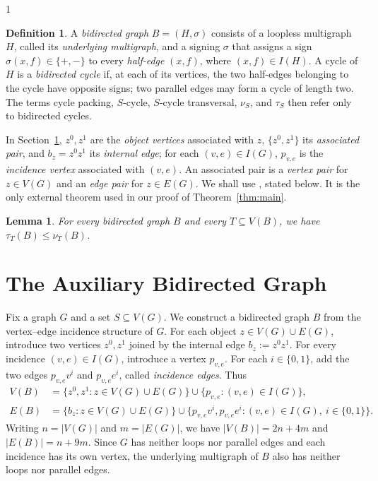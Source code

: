 \documentclass[a4paper,11pt]{article}
\theoremstyle{plain}
\newtheorem{lemma}[theorem]{Lemma}
\theoremstyle{definition}
\newtheorem{definition}[theorem]{Definition}
\theoremstyle{remark}
\begin{document}
\begin{spacing}{1}
\begin{definition}\label{def:bidirected}
A \emph{bidirected graph} $B=(H,\sigma)$ consists of a loopless multigraph
$H$, called its \emph{underlying multigraph}, and a signing $\sigma$ that
assigns a sign $\sigma(x,f)\in\{+,-\}$ to every \emph{half-edge} $(x,f)$,
where $(x,f)\in I(H)$.  A cycle of $H$ is a \emph{bidirected cycle} if, at
each of its vertices, the two half-edges belonging to the cycle have opposite
signs; two parallel edges may form a cycle of length two.  The terms cycle packing, $S$-cycle,
$S$-cycle transversal, $\nu_S$, and $\tau_S$ then refer only to bidirected
cycles.
\end{definition}

In Section~\ref{sec:construction}, $z^0,z^1$ are the \emph{object vertices}
associated with $z$, $\{z^0,z^1\}$ its \emph{associated pair}, and
$b_z=z^0z^1$ its \emph{internal edge}; for each $(v,e)\in I(G)$,
$p_{v,e}$ is the \emph{incidence vertex} associated with $(v,e)$.  An
associated pair is a \emph{vertex pair}
for $z\in V(G)$ and an \emph{edge pair} for $z\in E(G)$.
We shall use \cite[Theorem~2.3]{BowlerEtAl2026}, stated below.  It is the only
external theorem used in our proof of Theorem~\ref{thm:main}.

\begin{lemma}\label{lem:bidirected}
For every bidirected graph $B$ and every $T\subseteq V(B)$, we have
$\tau_T(B)\leq \nu_T(B)$.
\end{lemma}

\section{The Auxiliary Bidirected Graph}\label{sec:construction}

Fix a graph $G$ and a set $S\subseteq V(G)$.  We construct a
bidirected graph $B$ from the vertex--edge incidence structure of $G$.  For
each object $z\in V(G)\cup E(G)$, introduce two vertices $z^0,z^1$ joined by
the internal edge $b_z:=z^0z^1$.  For every incidence $(v,e)\in I(G)$,
introduce a vertex $p_{v,e}$.  For each $i\in\{0,1\}$, add the two edges
$p_{v,e}v^i$ and $p_{v,e}e^i$, called \emph{incidence edges}.  Thus
\[
\begin{aligned}
V(B)&=\{z^0,z^1:z\in V(G)\cup E(G)\}
      \cup\{p_{v,e}:(v,e)\in I(G)\},\\
E(B)&=\{b_z:z\in V(G)\cup E(G)\}
      \cup\{p_{v,e}v^i,p_{v,e}e^i:(v,e)\in I(G),\ i\in\{0,1\}\}.
\end{aligned}
\]
Writing $n=|V(G)|$ and $m=|E(G)|$, we have
$|V(B)|=2n+4m$ and $|E(B)|=n+9m$.  Since $G$ has neither loops nor parallel
edges and each incidence has its own vertex, the underlying multigraph of
$B$ also has neither loops nor parallel edges.


\end{spacing}
\end{document}
